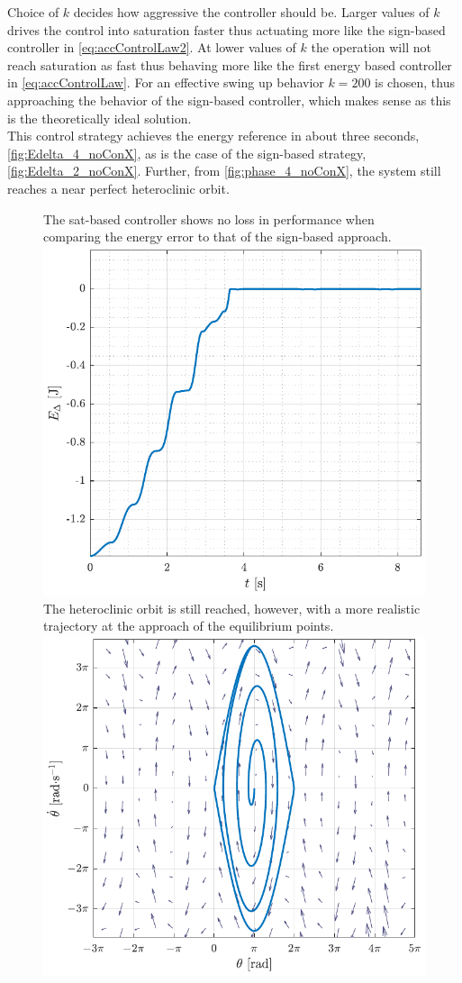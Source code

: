 Choice of $k$ decides how aggressive the controller should be. Larger values of $k$ drives the control into saturation faster thus actuating more like the sign-based controller in \autoref{eq:accControlLaw2}. At lower values of $k$ the operation will not reach saturation as fast thus behaving more like the first energy based controller in \autoref{eq:accControlLaw}. For an effective swing up behavior $k=200$ is chosen, thus approaching the behavior of the sign-based controller, which makes sense as this is the theoretically ideal solution.\\
This control strategy achieves the energy reference in about three seconds, \autoref{fig:Edelta_4_noConX}, as is the case of the sign-based strategy, \autoref{fig:Edelta_2_noConX}. Further, from  \autoref{fig:phase_4_noConX}, the system still reaches a near perfect heteroclinic orbit.
%
\begin{figure}[H]
  \hspace{-10pt}
  \captionbox
  {
    The sat-based controller shows no loss in performance when comparing the energy error to that of the sign-based approach.
    \label{fig:Edelta_4_noConX}
  }
  {
    \hspace{-1cm}
    \includegraphics[width=.448\textwidth]{figures/Edelta_4_noConX}
  }
  \hspace{20pt}
  \captionbox 
  {
    The heteroclinic orbit is still reached, however, with a more realistic trajectory at the approach of the equilibrium points.
    \label{fig:phase_4_noConX}
  }
  {
    \hspace{-1cm}
    \includegraphics[width=.46\textwidth]{figures/phase_4_noConX}
  }  
\end{figure}
